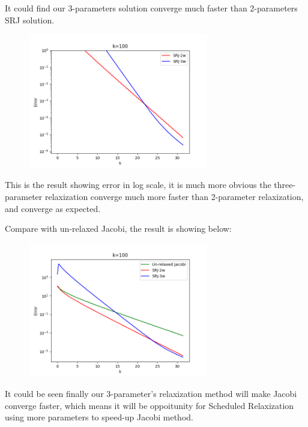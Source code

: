 \documentclass[12pt]{article}
\begin{document}
It could find our 3-parameters solution converge much faster than 2-parameters
SRJ solution.


\begin{figure}[H]
    \centering
    \includegraphics[width=0.7\textwidth]{pcompare2.PNG }
    
    \label{pcompare1.PNG    }
\end{figure}

This is the result showing error in log scale, it is much more obvious the 
three-parameter relaxization converge much more faster than 2-parameter relaxization,
and converge as expected.



Compare with un-relaxed Jacobi, the result is showing below:

\begin{figure}[H]
    \centering
    \includegraphics[width=0.7\textwidth]{pcomparetotal.PNG }
    
    \label{pcompare1.PNG    }
\end{figure}

It could be seen finally our 3-parameter's relaxization method will make Jacobi
converge faster, which means it will be oppoitunity for Scheduled Relaxization
using more parameters to speed-up Jacobi method.
\end{document}
